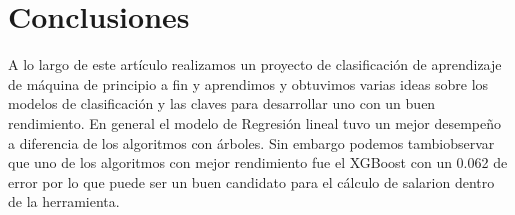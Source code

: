 \newpage
\section{Conclusiones}

A lo largo de este art\'iculo realizamos un proyecto de clasificación de aprendizaje de máquina de principio a fin y aprendimos y obtuvimos varias ideas sobre los modelos de clasificación y las claves para desarrollar uno con un buen rendimiento.
En general el modelo de Regresi\'on lineal tuvo un mejor desempeño a diferencia de los algoritmos con \'arboles. Sin embargo podemos tambi observar que uno de los algoritmos con mejor rendimiento fue el XGBoost con un 0.062 de error por lo que puede ser un buen candidato para el c\'alculo de salarion dentro de la herramienta.